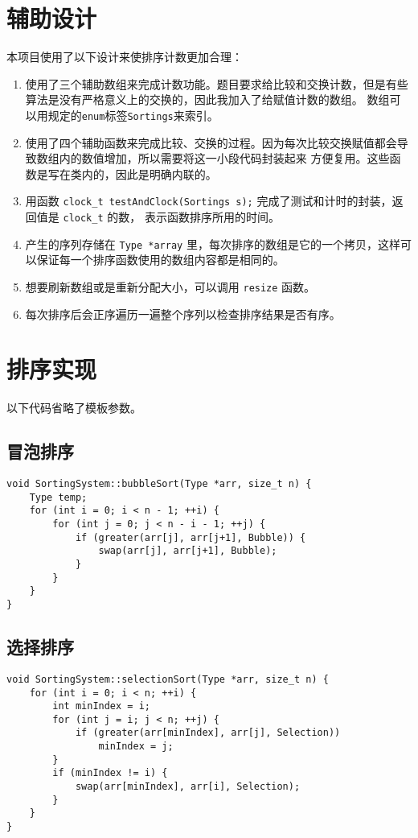 \chapter{辅助设计}

本项目使用了以下设计来使排序计数更加合理：

\begin{enumerate}
    \item 使用了三个辅助数组来完成计数功能。题目要求给比较和交换计数，但是有些算法是没有严格意义上的交换的，因此我加入了给赋值计数的数组。
          数组可以用规定的\lstinline{enum}标签\lstinline{Sortings}来索引。
    \item 使用了四个辅助函数来完成比较、交换的过程。因为每次比较交换赋值都会导致数组内的数值增加，所以需要将这一小段代码封装起来%
          方便复用。这些函数是写在类内的，因此是明确内联的。
    \item 用函数 \lstinline{clock_t testAndClock(Sortings s);} 完成了测试和计时的封装，返回值是 \lstinline{clock_t} 的数，%
          表示函数排序所用的时间。
    \item 产生的序列存储在 \lstinline{Type *array} 里，每次排序的数组是它的一个拷贝，这样可以保证每一个排序函数使用的数组内容都是相同的。%
    \item 想要刷新数组或是重新分配大小，可以调用 \lstinline{resize} 函数。
    \item 每次排序后会正序遍历一遍整个序列以检查排序结果是否有序。
\end{enumerate}

\chapter{排序实现}

以下代码省略了模板参数。

\section{冒泡排序}
\begin{lstlisting}[firstnumber= 97, caption=bubbleSort]
void SortingSystem::bubbleSort(Type *arr, size_t n) {
    Type temp;
    for (int i = 0; i < n - 1; ++i) {
        for (int j = 0; j < n - i - 1; ++j) {
            if (greater(arr[j], arr[j+1], Bubble)) {
                swap(arr[j], arr[j+1], Bubble);
            }
        }
    }
}
\end{lstlisting}

\section{选择排序}
\begin{lstlisting}[firstnumber=109 , caption=selectionSort]
void SortingSystem::selectionSort(Type *arr, size_t n) {
    for (int i = 0; i < n; ++i) {
        int minIndex = i;
        for (int j = i; j < n; ++j) {
            if (greater(arr[minIndex], arr[j], Selection))
                minIndex = j;
        }
        if (minIndex != i) {
            swap(arr[minIndex], arr[i], Selection);
        }
    }
}
\end{lstlisting}

